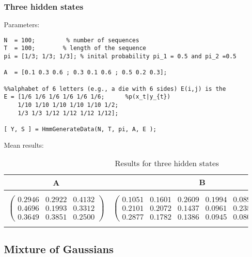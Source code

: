 \documentclass[10pt, a4paper]{article}
\begin{document}
\subsubsection{Three hidden states}
Parameters:
\begin{verbatim}
N  = 100;         % number of sequences
T  = 100;        % length of the sequence
pi = [1/3; 1/3; 1/3]; % inital probability pi_1 = 0.5 and pi_2 =0.5

A  = [0.1 0.3 0.6 ; 0.3 0.1 0.6 ; 0.5 0.2 0.3];

%%alphabet of 6 letters (e.g., a die with 6 sides) E(i,j) is the
E = [1/6 1/6 1/6 1/6 1/6 1/6;      %p(x_t|y_{t}) 
    1/10 1/10 1/10 1/10 1/10 1/2;
    1/3 1/3 1/12 1/12 1/12 1/12];

[ Y, S ] = HmmGenerateData(N, T, pi, A, E ); 
\end{verbatim}
Mean results:
\begin{table}[h]
\centering
\begin{tabular}{|c|c|c|}
\hline
\textbf{A} & $\mathbf{B}$ & $\mathbf{\pi}$\\
\hline
$\begin{pmatrix}
0.2946 &   0.2922 &   0.4132\\
0.4696 &   0.1993 &   0.3312\\
0.3649 &   0.3851 &   0.2500
\end{pmatrix}$ & $\begin{pmatrix}
0.1051  &  0.1601  &  0.2609 &   0.1994 &   0.0898 &   0.1847\\
0.2101  &  0.2072  &  0.1437 &   0.0961 &   0.2386 &   0.1043\\
0.2877  &  0.1782  &  0.1386 &   0.0945 &   0.0809 &   0.2200
\end{pmatrix}$ & [0.2712, 0.3468, 0.3821]\\
\hline
\end{tabular}
\caption{Results for three hidden states}
\end{table}

\subsection{Mixture of Gaussians}
\end{document}
